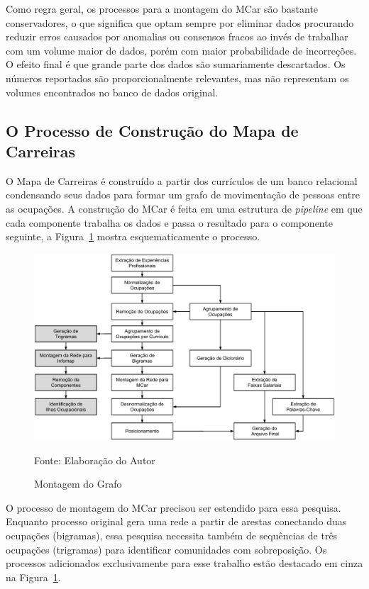 \documentclass[12pt,a4paper]{article}
\newcommand{\source}[1]{\vspace{-10pt} \caption*{Fonte: {#1}} }
\begin{document}
Como regra geral, os processos para a montagem do MCar são bastante conservadores, o que significa que optam sempre por eliminar dados procurando reduzir erros causados por anomalias ou consensos fracos ao invés de trabalhar com um volume maior de dados, porém com maior probabilidade de incorreções. O efeito final é que grande parte dos dados são sumariamente descartados. Os números reportados são proporcionalmente relevantes, mas não representam os volumes encontrados no banco de dados original.

\subsection{O Processo de Construção do Mapa de Carreiras} \label{sec:construcao}

O Mapa de Carreiras é construído a partir dos currículos de um banco relacional condensando seus dados para formar um grafo de movimentação de pessoas entre as ocupações. A construção do MCar é feita em uma estrutura de \textit{pipeline} em que cada componente trabalha os dados e passa o resultado para o componente seguinte, a Figura~\ref{fig:montagem-do-grafo} mostra esquematicamente o processo.

\begin{figure}[ht]
    \centering
    \includegraphics[scale=0.4]{pipeline1.pdf}
    \caption{Montagem do Grafo}
    \label{fig:montagem-do-grafo}
    \source{Elaboração do Autor}
\end{figure}

O processo de montagem do MCar precisou ser estendido para essa pesquisa. Enquanto processo original gera uma rede a partir de arestas conectando duas ocupações (bigramas), essa pesquisa necessita também de sequências de três ocupações (trigramas) para identificar comunidades com sobreposição. Os processos adicionados exclusivamente para esse trabalho estão destacado em cinza na Figura~\ref{fig:montagem-do-grafo}.
\end{document}
